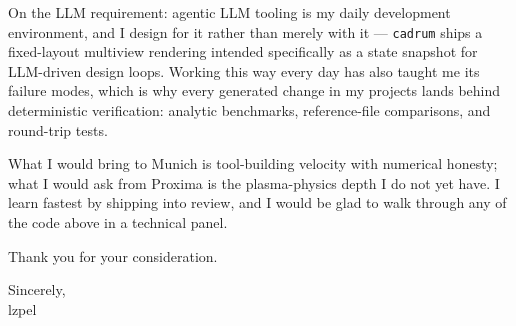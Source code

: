 \documentclass[11pt]{article}
\begin{document}
On the LLM requirement: agentic LLM tooling is my daily development environment,
and I design for it rather than merely with it --- \texttt{cadrum} ships a
fixed-layout multiview rendering intended specifically as a state snapshot for
LLM-driven design loops. Working this way every day has also taught me its failure
modes, which is why every generated change in my projects lands behind
deterministic verification: analytic benchmarks, reference-file comparisons, and
round-trip tests.

What I would bring to Munich is tool-building velocity with numerical honesty; what
I would ask from Proxima is the plasma-physics depth I do not yet have. I learn
fastest by shipping into review, and I would be glad to walk through any of the
code above in a technical panel.

Thank you for your consideration.

Sincerely, \\
lzpel %
\end{document}
